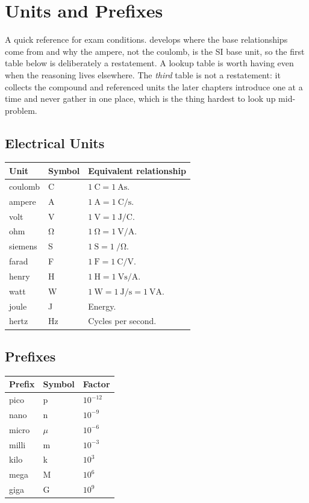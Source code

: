\chapter{Units and Prefixes}
\label{app:units}
A quick reference for exam conditions.  develops where the base
relationships come from and why the ampere, not the coulomb, is the SI base unit, so
the first table below is deliberately a restatement. A lookup table is worth having
even when the reasoning lives elsewhere. The \emph{third} table is not a restatement:
it collects the compound and referenced units the later chapters introduce one at a
time and never gather in one place, which is the thing hardest to look up mid-problem.

\section{Electrical Units}
\begin{tabularx}{\textwidth}{@{}L{0.22\textwidth}L{0.18\textwidth}Y@{}}
\toprule
Unit & Symbol & Equivalent relationship \\
\midrule
coulomb & \si{\coulomb} & \(\SI{1}{\coulomb}=\SI{1}{\ampere\second}\). \\
ampere & \si{\ampere} & \(\SI{1}{\ampere}=\SI{1}{\coulomb\per\second}\). \\
volt & \si{\volt} & \(\SI{1}{\volt}=\SI{1}{\joule\per\coulomb}\). \\
ohm & \si{\ohm} & \(\SI{1}{\ohm}=\SI{1}{\volt\per\ampere}\). \\
siemens & \si{\siemens} & \(\SI{1}{\siemens}=\SI{1}{\per\ohm}\). \\
farad & \si{\farad} & \(\SI{1}{\farad}=\SI{1}{\coulomb\per\volt}\). \\
henry & \si{\henry} & \(\SI{1}{\henry}=\SI{1}{\volt\second\per\ampere}\). \\
watt & \si{\watt} & \(\SI{1}{\watt}=\SI{1}{\joule\per\second}=\SI{1}{\volt\ampere}\). \\
joule & \si{\joule} & Energy. \\
hertz & \si{\hertz} & Cycles per second. \\
\bottomrule
\end{tabularx}

\section{Prefixes}
\begin{center}
\begin{tabular}{@{}lll@{}}
\toprule
Prefix & Symbol & Factor \\
\midrule
pico & p & \(10^{-12}\) \\
nano & n & \(10^{-9}\) \\
micro & \(\mu\) & \(10^{-6}\) \\
milli & m & \(10^{-3}\) \\
kilo & k & \(10^{3}\) \\
mega & M & \(10^{6}\) \\
giga & G & \(10^{9}\) \\
\bottomrule
\end{tabular}
\end{center}

